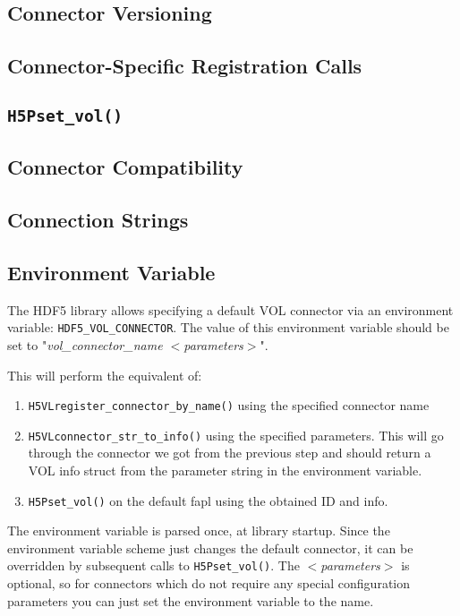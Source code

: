 \subsection{Connector Versioning}
\subsection{Connector-Specific Registration Calls}
\subsection{\tt H5Pset\_vol()}
\subsection{Connector Compatibility}

\thgfuturewarning


\subsection{Connection Strings}
\subsection{Environment Variable}

The HDF5 library allows specifying a default VOL connector via an environment variable: {\tt HDF5\_VOL\_CONNECTOR}. The value of this environment variable should be set to "\textit{vol\_connector\_name $<$parameters$>$}".

This will perform the equivalent of:

\begin{enumerate}
    \item {\tt H5VLregister\_connector\_by\_name()} using the specified connector name
    \item {\tt H5VLconnector\_str\_to\_info()} using the specified parameters. This will go through the connector we got from the previous step and should return a VOL info struct from the parameter string in the environment variable.
    \item {\tt H5Pset\_vol()} on the default fapl using the obtained ID and info.
\end{enumerate}

The environment variable is parsed once, at library startup. Since the environment variable scheme just changes the default connector, it can be overridden by subsequent calls to {\tt H5Pset\_vol()}. The \textit{$<$parameters$>$} is optional, so for connectors which do not require any special configuration parameters you can just set the environment variable to the name.

